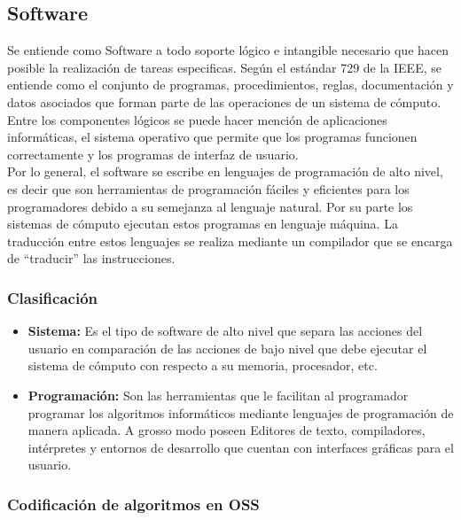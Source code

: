 % 
% 
% 

\subsection{Software}

Se entiende como Software a todo soporte lógico e intangible necesario que hacen posible la realización de tareas especificas. Según el estándar 729 de la IEEE, se entiende como  el conjunto de programas, procedimientos, reglas, documentación y datos asociados que forman parte de las operaciones de un sistema de cómputo. Entre los componentes lógicos se puede hacer mención de aplicaciones informáticas, el sistema operativo que permite que los programas funcionen correctamente y los programas de interfaz de usuario. \\

Por lo general, el software se escribe en lenguajes de programación de alto nivel, es decir que son herramientas de programación fáciles y eficientes para los programadores debido a su semejanza al lenguaje natural. Por su parte los sistemas de cómputo ejecutan estos programas en lenguaje máquina. La traducción entre estos lenguajes se realiza mediante un compilador que se encarga de ``traducir'' las instrucciones.

\subsubsection{Clasificación}
\begin{itemize}

    \item \textbf{Sistema: }
    Es el tipo de software de alto nivel que separa las acciones del usuario en comparación de las acciones de bajo nivel que debe ejecutar el sistema de cómputo con respecto a su memoria, procesador, etc.
    
    \item \textbf{Programación: }
   Son las herramientas que le facilitan al programador programar los algoritmos informáticos mediante lenguajes de programación de manera aplicada. A grosso modo poseen Editores de texto, compiladores, intérpretes y entornos de desarrollo que cuentan con interfaces gráficas para el usuario.
    
\end{itemize}

\subsubsection{Codificación de algoritmos en OSS}

